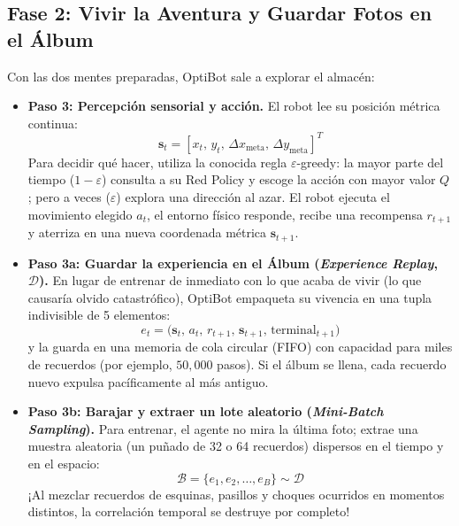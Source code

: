 \subsection{Fase 2: Vivir la Aventura y Guardar Fotos en el Álbum}
Con las dos mentes preparadas, OptiBot sale a explorar el almacén:
\begin{itemize}
  \item \textbf{Paso 3: Percepción sensorial y acción.} El robot lee su posición métrica continua:
  \begin{equation}
    \mathbf{s}_t = [x_t, \, y_t, \, \Delta x_{\text{meta}}, \, \Delta y_{\text{meta}}]^T
  \end{equation}
  Para decidir qué hacer, utiliza la conocida regla $\varepsilon$-greedy: la mayor parte del tiempo ($1-\varepsilon$) consulta a su Red Policy y escoge la acción con mayor valor $Q$; pero a veces ($\varepsilon$) explora una dirección al azar. El robot ejecuta el movimiento elegido $a_t$, el entorno físico responde, recibe una recompensa $r_{t+1}$ y aterriza en una nueva coordenada métrica $\mathbf{s}_{t+1}$.
  \item \textbf{Paso 3a: Guardar la experiencia en el Álbum (\textit{Experience Replay}, $\mathcal{D}$).} En lugar de entrenar de inmediato con lo que acaba de vivir (lo que causaría olvido catastrófico), OptiBot empaqueta su vivencia en una tupla indivisible de 5 elementos:
  \begin{equation}
    e_t = \big( \mathbf{s}_t, \, a_t, \, r_{t+1}, \, \mathbf{s}_{t+1}, \, \text{terminal}_{t+1} \big)
  \end{equation}
  y la guarda en una memoria de cola circular (FIFO) con capacidad para miles de recuerdos (por ejemplo, $50{,}000$ pasos). Si el álbum se llena, cada recuerdo nuevo expulsa pacíficamente al más antiguo.
  \item \textbf{Paso 3b: Barajar y extraer un lote aleatorio (\textit{Mini-Batch Sampling}).} Para entrenar, el agente no mira la última foto; extrae una muestra aleatoria (un puñado de 32 o 64 recuerdos) dispersos en el tiempo y en el espacio:
  \begin{equation}
    \mathcal{B} = \{e_1, e_2, \dots, e_B\} \sim \mathcal{D}
  \end{equation}
  ¡Al mezclar recuerdos de esquinas, pasillos y choques ocurridos en momentos distintos, la correlación temporal se destruye por completo!
\end{itemize}

